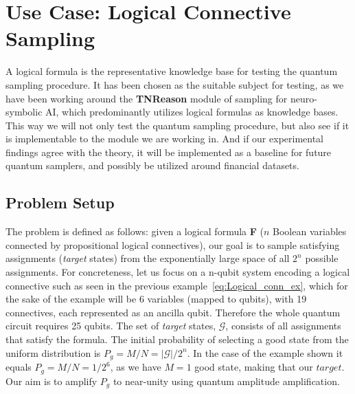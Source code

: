 \documentclass[encoding=utf8,british]{tumphthesis}
\begin{document}
    \section{Use Case: Logical Connective Sampling}            
        A logical formula is the representative knowledge base for testing the quantum sampling procedure. It has been chosen as the suitable subject 
        for testing, as we have been working around the \textbf{TNReason} module of sampling for neuro-symbolic AI, which predominantly utilizes 
        logical formulas as knowledge bases. This way we will not only test the quantum sampling procedure, but also see if it is implementable
        to the module we are working in. And if our experimental findings agree with the theory, it will be implemented as a baseline for future 
        quantum samplers, and possibly be utilized around financial datasets.

        \subsection{Problem Setup}
        \label{subsect:EE_Setup}

            The problem is defined as follows: given a logical formula \textbf{F} ($n$ Boolean variables connected by propositional logical connectives), our 
            goal is to sample satisfying assignments (\textit{target} states) from the exponentially large space of all $2^n$ possible assignments.
            For concreteness, let us focus on a n-qubit system encoding a logical connective such as seen in the previous example~\ref{eq:Logical_conn_ex}, 
            which for the sake of the example will be 6 variables (mapped to qubits), with 19 connectives, each represented as an ancilla qubit. 
            Therefore the whole quantum circuit requires 25 qubits. The set of \textit{target} states, $\mathcal{G}$, consists of all assignments that 
            satisfy the formula. The initial probability of selecting a good state from the uniform distribution is $P_g = M/N = |\mathcal{G}|/2^n$. 
            In the case of the example shown it equals $P_g = M/N = 1/2^6$, as we have $M=1$ good state, making that our $target$.
            Our aim is to amplify $P_g$ to near-unity using quantum amplitude amplification.
\end{document}

